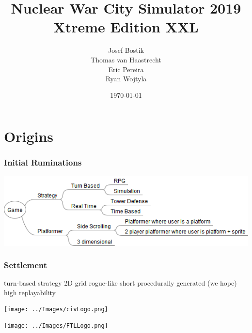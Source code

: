 \documentclass[aspectratio=169]{beamer}
\begin{document}

\title{Nuclear War City Simulator 2019 Xtreme Edition XXL}
\author[]{Josef Bostik \\
  Thomas van Haastrecht \\
  Eric Pereira \\
  Ryan Wojtyla}
\date{\today}

\begin{frame}
  \titlepage
\end{frame}


\section{Origins}


\begin{frame}

  \frametitle{Initial Ruminations}

  \begin{center}
    \includegraphics[scale=0.5]{../Diagrams/Game/Game.png}
  \end{center}

\end{frame}



\begin{frame}

  \frametitle{Settlement}

  \begin{multicols}{2}

  \begin{outline}
    \1 turn-based strategy
    \1 2D grid
    \1 rogue-like
      \2 short
      \2 procedurally generated (we hope)
      \2 high replayability
  \end{outline}

  \columnbreak

  \begin{center}
    \texttt{[image: ../Images/civLogo.png]}
  \end{center}

  \begin{center}
    \texttt{[image: ../Images/FTLLogo.png]}
  \end{center}

  \end{multicols}

\end{frame}
\end{document}
